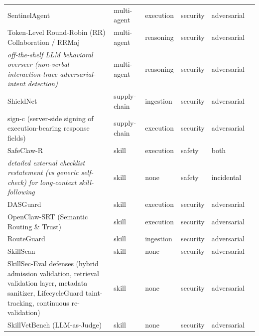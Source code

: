 \begin{longtable}{@{}p{}lllll@{}}
SentinelAgent & multi-agent & execution & security & adversarial & \cite{he-2025-sentinelagent} \\
Token-Level Round-Robin (RR) Collaboration / RRMaj & multi-agent & reasoning & security & adversarial & \cite{liu-2026-consensus} \\
\emph{off-the-shelf LLM behavioral overseer (non-verbal interaction-trace adversarial-intent detection)} & multi-agent & reasoning & security & adversarial & \cite{musaffar-2026-detection} \\
ShieldNet & supply-chain & ingestion & security & adversarial & \cite{yuan-2026-shieldnet} \\
sign-c (server-side signing of execution-bearing response fields) & supply-chain & execution & security & adversarial & \cite{luo-2026-rewriting} \\
SafeClaw-R & skill & execution & safety & both & \cite{wang-2026-safeclawr} \\
\emph{detailed external checklist restatement (vs generic self-check) for long-context skill-following} & skill & none & safety & incidental & \cite{xue-2026-agent} \\
DASGuard & skill & execution & security & adversarial & \cite{tan-2026-prompt} \\
OpenClaw-SRT (Semantic Routing \& Trust) & skill & execution & security & adversarial & \cite{chen-2026-openclawsrt} \\
RouteGuard & skill & ingestion & security & adversarial & \cite{xiao-2026-routeguard} \\
SkillScan & skill & none & security & adversarial & \cite{liu-2026-agentb} \\
SkillSec-Eval defenses (hybrid admission validation, retrieval validation layer, metadata sanitizer, LifecycleGuard taint-tracking, continuous re-validation) & skill & none & security & adversarial & \cite{badhe-2026-agent} \\
SkillVetBench (LLM-as-Judge) & skill & none & security & adversarial & \cite{hossain-2026-skillvetbench} \\
\end{longtable}
\endgroup
